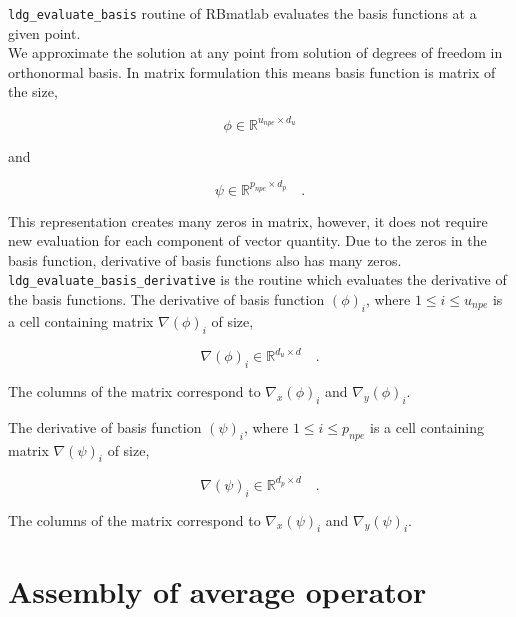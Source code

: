 \documentclass[a4paper,openany]{book}
\begin{document}
\verb|ldg_evaluate_basis| routine of RBmatlab evaluates the basis functions at a given point.\\

We approximate the solution at any point from solution of degrees of freedom in orthonormal basis. In matrix formulation this means basis function is matrix of the size,

\begin{equation}\label{basis_func_velocity_rbmatlab}
\phi \in \mathbb{R}^{u_{npe} \times d_u}
\end{equation}

and

\begin{equation}\label{basis_func_pressure_rbmatlab}
\psi \in \mathbb{R}^{p_{npe} \times d_p} \quad \textrm{.}
\end{equation}

This representation creates many zeros in matrix, however, it does not require new evaluation for each component of vector quantity. Due to the zeros in the basis function, derivative of basis functions also has many zeros.\\

\verb|ldg_evaluate_basis_derivative| is the routine which evaluates the derivative of the basis functions. The derivative of basis function $(\phi)_{i}$, where $1 \leq i \leq u_{npe}$ is a cell containing matrix $\nabla (\phi)_{i}$ of size,

\begin{equation}\label{basis_func_derivative_velocity_rbmatlab}
\nabla (\phi)_{i} \in \mathbb{R}^{{d_u} \times d} \quad \textrm{.}
\end{equation}

The columns of the matrix correspond to $\nabla_x (\phi)_{i}$ and $\nabla_y (\phi)_{i}$.

The derivative of basis function $(\psi)_{i}$, where $1 \leq i \leq p_{npe}$ is a cell containing matrix $\nabla (\psi)_{i}$ of size,

\begin{equation}\label{basis_func_derivative_pressure_rbmatlab}
\nabla (\psi)_{i} \in \mathbb{R}^{{d_p} \times d} \quad \textrm{.}
\end{equation}

The columns of the matrix correspond to $\nabla_x (\psi)_{i}$ and $\nabla_y (\psi)_{i}$.

\section{Assembly of average operator}
\end{document}
